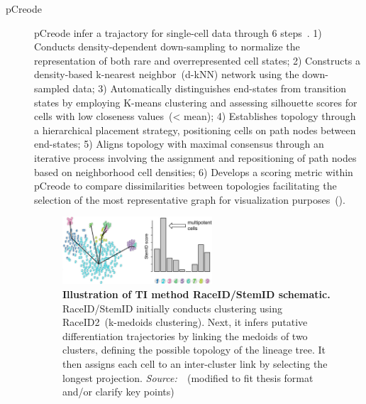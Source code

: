 \begin{description}
  \item[pCreode]

  pCreode infer a trajactory for single-cell data through 6 steps~\citep{herring2018pCreode}. 1) Conducts density-dependent down-sampling to normalize the representation of both rare and overrepresented cell states; 2) Constructs a density-based k-nearest neighbor~(d-kNN) network using the down-sampled data; 3) Automatically distinguishes end-states from transition states by employing K-means clustering and assessing silhouette scores for cells with low closeness values~(< mean); 4) Establishes topology through a hierarchical placement strategy, positioning cells on path nodes between end-states; 5) Aligns topology with maximal consensus through an iterative process involving the assignment and repositioning of path nodes based on neighborhood cell densities; 6) Develops a scoring metric within pCreode to compare dissimilarities between topologies facilitating the selection of the most representative graph for visualization purposes~().

  \begin{figure}[h!]
  	\centering
  	\includegraphics[width=0.55\textwidth]{TI_Alg_StemID/fig}
  	\vspace{0.1cm}
  	\caption[Illustration of TI method RaceID/StemID schematic.]{\textbf{Illustration of TI method RaceID/StemID schematic.}
  	RaceID/StemID initially conducts clustering using RaceID2~(k-medoids clustering). Next, it infers putative differentiation trajectories by linking the medoids of two clusters, defining the possible topology of the lineage tree. It then assigns each cell to an inter-cluster link by selecting the longest projection. \emph{Source:~\cite{albergante2020ElPiGraph}}~(modified to fit thesis format and/or clarify key points)
  	}
  	\label{fig:TI_Alg_StemID}
  \end{figure}


\end{description}
